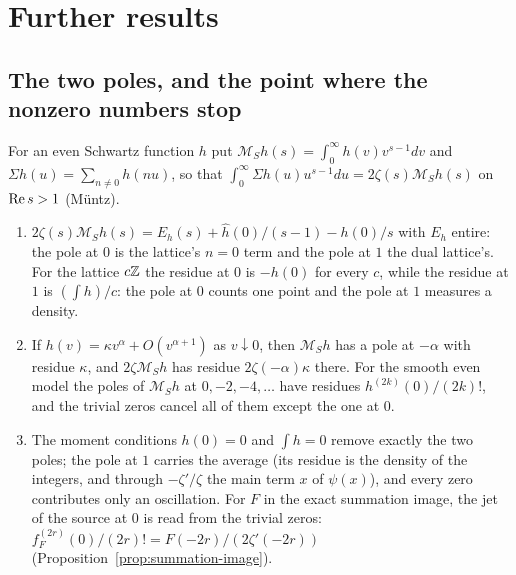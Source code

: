 \section{Further results}\label{sec:other}

\subsection{The two poles, and the point where the nonzero numbers stop}

For an even Schwartz function $h$ put $\mathcal{M}_Sh(s)=\int_0^\infty h(v)v^{s-1}dv$ and $\Sigma h(u)=\sum_{n\ne0}h(nu)$, so that $\int_0^\infty\Sigma h(u)u^{s-1}du=2\zeta(s)\mathcal{M}_Sh(s)$ on $\operatorname{Re} s>1$ (Müntz).

\begin{proposition}\label{prop:poles}
\begin{enumerate}[label=(\alph*)]
\item $2\zeta(s)\mathcal{M}_Sh(s)=E_h(s)+\hat h(0)/(s-1)-h(0)/s$ with $E_h$ entire: the pole at $0$ is the lattice's $n=0$ term and the pole at $1$ the dual lattice's. For the lattice $c\mathbb{Z}$ the residue at $0$ is $-h(0)$ for every $c$, while the residue at $1$ is $(\int h)/c$: the pole at $0$ counts one point and the pole at $1$ measures a density.
\item If $h(v)=\kappa v^\alpha+O(v^{\alpha+1})$ as $v\downarrow0$, then $\mathcal{M}_Sh$ has a pole at $-\alpha$ with residue $\kappa$, and $2\zeta\mathcal{M}_Sh$ has residue $2\zeta(-\alpha)\kappa$ there. For the smooth even model the poles of $\mathcal{M}_Sh$ at $0,-2,-4,\dots$ have residues $h^{(2k)}(0)/(2k)!$, and the trivial zeros cancel all of them except the one at $0$.
\item The moment conditions $h(0)=0$ and $\int h=0$ remove exactly the two poles; the pole at $1$ carries the average (its residue is the density of the integers, and through $-\zeta'/\zeta$ the main term $x$ of $\psi(x)$), and every zero contributes only an oscillation. For $F$ in the exact summation image, the jet of the source at $0$ is read from the trivial zeros: $f_F^{(2r)}(0)/(2r)!=F(-2r)/(2\zeta'(-2r))$ (Proposition~\ref{prop:summation-image}).
\end{enumerate}
\end{proposition}

